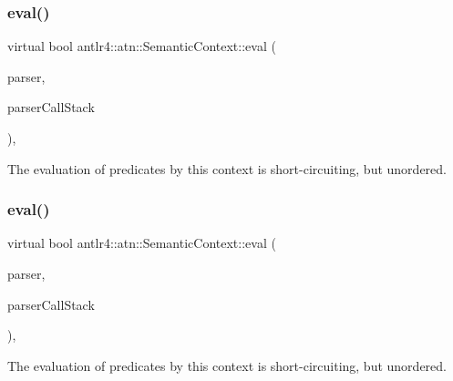 \subsubsection{\texorpdfstring{eval()}{eval()}\hspace{0.1cm}{\footnotesize\ttfamily [2/3]}}
{\footnotesize\ttfamily virtual bool antlr4\+::atn\+::\+Semantic\+Context\+::eval (\begin{DoxyParamCaption}\item[{\hyperlink{classantlr4_1_1Recognizer}{Recognizer} $\ast$}]{parser,  }\item[{\hyperlink{classantlr4_1_1RuleContext}{Rule\+Context} $\ast$}]{parser\+Call\+Stack }\end{DoxyParamCaption})\hspace{0.3cm}{\ttfamily [override]}, {\ttfamily [virtual]}}

The evaluation of predicates by this context is short-\/circuiting, but unordered.\mbox{\label{classantlr4_1_1atn_1_1SemanticContext_aaf020c5b73a8d0216f8423acd5d4cea8}} 
\subsubsection{\texorpdfstring{eval()}{eval()}\hspace{0.1cm}{\footnotesize\ttfamily [3/3]}}
{\footnotesize\ttfamily virtual bool antlr4\+::atn\+::\+Semantic\+Context\+::eval (\begin{DoxyParamCaption}\item[{\hyperlink{classantlr4_1_1Recognizer}{Recognizer} $\ast$}]{parser,  }\item[{\hyperlink{classantlr4_1_1RuleContext}{Rule\+Context} $\ast$}]{parser\+Call\+Stack }\end{DoxyParamCaption})\hspace{0.3cm}{\ttfamily [override]}, {\ttfamily [virtual]}}

The evaluation of predicates by this context is short-\/circuiting, but unordered. \mbox{\label{classantlr4_1_1atn_1_1SemanticContext_a09cae49496728bdd0aa3147ffdc152cb}} 
